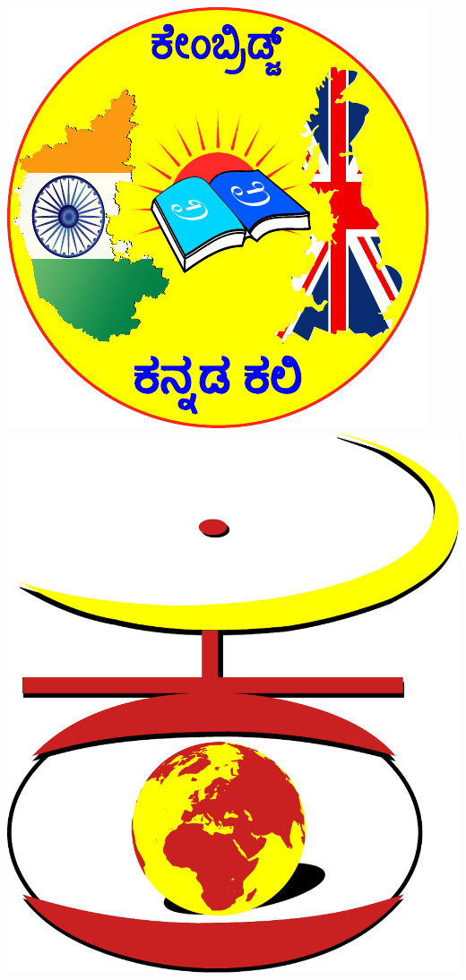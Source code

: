 \begin{titlepage}
	\vspace{2cm} %
	\includegraphics[scale=0.4]{KKali_logo.pdf}
	\hspace{2cm}
	\includegraphics[scale=0.19]{VishvaKannadaLogo.pdf}
	\vfill
	

\end{titlepage}
